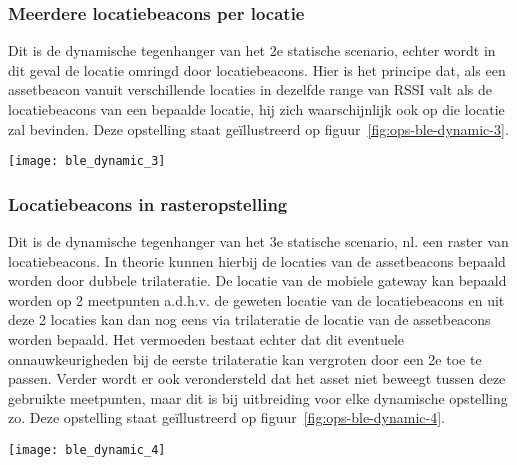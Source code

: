 \subsubsection{Meerdere locatiebeacons per locatie}
\begin{minipage}{0.65\textwidth}
Dit is de dynamische tegenhanger van het 2e statische scenario, echter wordt in dit geval de locatie omringd door locatiebeacons. Hier is het principe dat, als een assetbeacon vanuit verschillende locaties in dezelfde range van RSSI valt als de locatiebeacons van een bepaalde locatie, hij zich waarschijnlijk ook op die locatie zal bevinden. Deze opstelling staat geïllustreerd op figuur~\ref{fig:ops-ble-dynamic-3}.
\end{minipage}
\hfill
\begin{minipage}{0.30\textwidth}
	\texttt{[image: ble\_dynamic\_3]}
	\label{fig:ops-ble-dynamic-3}
\end{minipage}

\subsubsection{Locatiebeacons in rasteropstelling}
\begin{minipage}{0.65\textwidth}
Dit is de dynamische tegenhanger van het 3e statische scenario, nl. een raster van locatiebeacons. In theorie kunnen hierbij de locaties van de assetbeacons bepaald worden door dubbele trilateratie. De locatie van de mobiele gateway kan bepaald worden op 2 meetpunten a.d.h.v. de geweten locatie van de locatiebeacons en uit deze 2 locaties kan dan nog eens via trilateratie de locatie van de assetbeacons worden bepaald. Het vermoeden bestaat echter dat dit eventuele onnauwkeurigheden bij de eerste trilateratie kan vergroten door een 2e toe te passen. Verder wordt er ook verondersteld dat het asset niet beweegt tussen deze gebruikte meetpunten, maar dit is bij uitbreiding voor elke dynamische opstelling zo. Deze opstelling staat geïllustreerd op figuur~\ref{fig:ops-ble-dynamic-4}.
\end{minipage}
\hfill
\begin{minipage}{0.30\textwidth}
	\texttt{[image: ble\_dynamic\_4]}
	\label{fig:ops-ble-dynamic-4}
\end{minipage}

